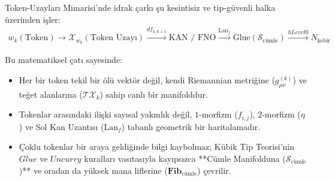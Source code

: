 \documentclass[11pt, a4paper]{article}
\begin{document}
Token-Uzayları Mimarisi'nde idrak çarkı şu kesintisiz ve tip-güvenli halka üzerinden işler:
\begin{align*}
w_k (\text{Token}) \to \mathcal{X}_{w_k} (\text{Token Uzayı}) \xrightarrow{df_{k, k+1}} \text{KAN / FNO} \xrightarrow{\text{Lan}_{f}} \text{Glue}(\mathcal{S}_{\text{cümle}}) \xrightarrow{hLevel 0} N_{\text{kebîr}}
\end{align*}

Bu matematiksel çatı sayesinde:
\begin{itemize}
    \item Her bir token tekil bir ölü vektör değil, kendi Riemannian metriğine ($g_{\mu\nu}^{(k)}$) ve teğet alanlarına ($\mathcal{T}\mathcal{X}_k$) sahip canlı bir manifolddur.
    \item Tokenlar arasındaki ilişki sayısal yakınlık değil, $1$-morfizm ($f_{i,j}$), $2$-morfizm ($\eta$) ve Sol Kan Uzantısı ($\text{Lan}_{f}$) tabanlı geometrik bir haritalamadır.
    \item Çoklu tokenlar bir araya geldiğinde bilgi kaybolmaz; Kübik Tip Teorisi'nin $Glue$ ve $Uncurry$ kuralları vasıtasıyla kayıpsızca **Cümle Manifolduna ($\mathcal{S}_{\text{cümle}}$)** ve oradan da yüksek mana liflerine ($\mathbf{Fib}_{\text{cümle}}$) çevrilir.
\end{itemize}
\end{document}
